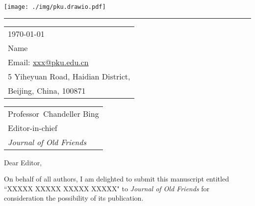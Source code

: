 \documentclass{article}
\newlength{\rulewidth}
\begin{document}

\texttt{[image: ./img/pku.drawio.pdf]} %

\vspace{-1em} %

\textcolor{pkured}{\rule{\linewidth}{}} %

\bigskip\bigskip %


\hfill
\begin{tabular}{l @{}}
\hfill \today \bigskip\\ %
\hfill Name \\ %
\hfill Email: \url{xxx@pku.edu.cn} \\ %
\hfill 5 Yiheyuan Road, Haidian District,\\
\hfill Beijing, China, 100871 \\ %
\end{tabular}

\bigskip %


\begin{tabular}{@{} l}
	Professor\ Chandeller Bing \\
	Editor-in-chief \\
	\textit{Journal of Old Friends}
\end{tabular}

\bigskip %

Dear Editor,

\bigskip %


On behalf of all authors, I am delighted to submit this manuscript entitled ``XXXXX XXXXX XXXXX XXXXX" to \textit{Journal of Old Friends} for consideration the possibility of its publication.
\end{document}
